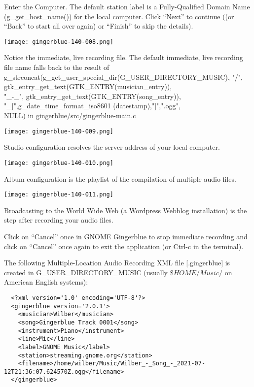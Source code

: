 \documentclass[UKenglish]{ifimaster}  %
\begin{document}
Enter the Computer. The default station label is a Fully-Qualified Domain Name (g\_get\_host\_name()) for the local computer. Click “Next” to continue ((or “Back” to start all over again) or “Finish” to skip the details).

{\texttt{[image: gingerblue-140-008.png]}}

Notice the immediate, live recording file.  The default immediate, live recording file name falls back to the result of\\
g\_strconcat(g\_get\_user\_special\_dir(G\_USER\_DIRECTORY\_MUSIC), "/",\\
gtk\_entry\_get\_text(GTK\_ENTRY(musician\_entry)),\\
"\_-\_", gtk\_entry\_get\_text(GTK\_ENTRY(song\_entry)),\\
"\_[",g\_date\_time\_format\_iso8601 (datestamp),"]",".ogg",\\
NULL) in gingerblue/src/gingerblue-main.c

{\texttt{[image: gingerblue-140-009.png]}}

Studio configuration resolves the server address of your local computer.

{\texttt{[image: gingerblue-140-010.png]}}

Album configuration is the playlist of the compilation of multiple audio files.

{\texttt{[image: gingerblue-140-011.png]}}

Broadcasting to the World Wide Web (a Wordpress Webblog installation)
is the step after recording your audio files.

Click on “Cancel” once in GNOME Gingerblue to stop immediate recording and click on “Cancel” once again to exit the application (or Ctrl-c in the terminal).

\newpage

The following Multiple-Location Audio Recording XML file [.gingerblue] is created in G\_USER\_DIRECTORY\_MUSIC (usually $\$HOME/Music/$ on American English systems):

\begin{scriptsize}
\begin{verbatim}
  <?xml version='1.0' encoding='UTF-8'?>
  <gingerblue version='2.0.1'>
    <musician>Wilber</musician>
    <song>Gingerblue Track 0001</song>
    <instrument>Piano</instrument>
    <line>Mic</line>
    <label>GNOME Music</label>
    <station>streaming.gnome.org</station>
    <filename>/home/wilber/Music/Wilber_-_Song_-_2021-07-12T21:36:07.624570Z.ogg</filename>
  </gingerblue>
\end{verbatim}
\end{scriptsize}
\end{document}
